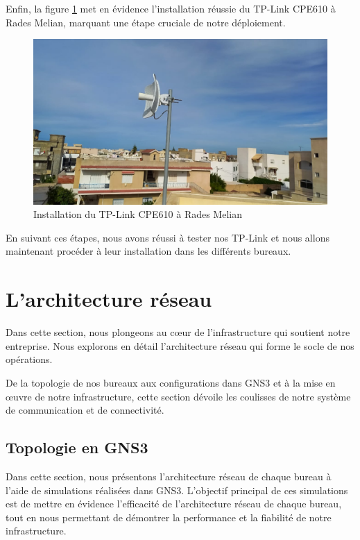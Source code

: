 Enfin, la figure \ref{Chap2.3.12} met en évidence l'installation réussie du TP-Link CPE610 à Rades Melian, marquant une étape cruciale de notre déploiement.

\begin{figure}[H]
\centering
\includegraphics[width=15cm]{Images/BRadesMelian-TPLinkCEP610-1.jpeg}
\caption{Installation du TP-Link CPE610 à Rades Melian}
\label{Chap2.3.12}
\end{figure}

En suivant ces étapes, nous avons réussi à tester nos TP-Link et nous allons maintenant procéder à leur installation dans les différents bureaux.

\section{L'architecture réseau}

Dans cette section, nous plongeons au cœur de l'infrastructure qui soutient notre entreprise. Nous explorons en détail l'architecture réseau qui forme le socle de nos opérations. 

De la topologie de nos bureaux aux configurations dans GNS3 et à la mise en œuvre de notre infrastructure, cette section dévoile les coulisses de notre système de communication et de connectivité.


\subsection{Topologie en GNS3}


Dans cette section, nous présentons l'architecture réseau de chaque bureau à l'aide de simulations réalisées dans GNS3. L'objectif principal de ces simulations est de mettre en évidence l'efficacité de l'architecture réseau de chaque bureau, tout en nous permettant de démontrer la performance et la fiabilité de notre infrastructure. 

